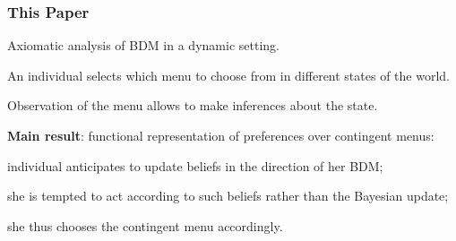 \documentclass[usenames,dvipsnames,aspectratio=169,11pt, envcountsect]{beamer}
\begin{document}
\begin{frame}\frametitle{This Paper}

	Axiomatic analysis of BDM in a dynamic setting.

	\vfill

	An individual selects which menu to choose from in different states of the world.

	\vfill

	Observation of the menu allows to make inferences about the state.

	\vfill \pause

	\textbf{Main result}: functional representation of preferences over contingent menus:

	\vfill

	\begin{wideitemize}
		\item individual anticipates to update beliefs in the direction of her BDM;
		\item she is tempted to act according to such beliefs rather than the Bayesian update;
		\item she thus chooses the contingent menu accordingly.
	\end{wideitemize}

\end{frame}
\end{document}
